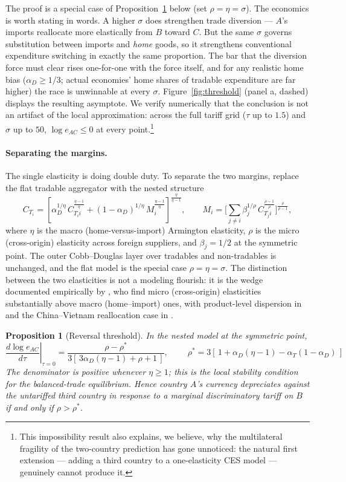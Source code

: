 \documentclass[11pt]{article}
\theoremstyle{plain}
\newtheorem{proposition}{Proposition}
\theoremstyle{remark}
\numberwithin{lemma}{section}
\numberwithin{proposition}{section}
\numberwithin{corollary}{section}
\newenvironment{revblock}{\par\begingroup\color{RevBlue}}{\endgroup\par}
\begin{document}
\begin{revblock}
The proof is a special case of Proposition~\ref{prop:threshold} below (set $\rho = \eta = \sigma$). The economics is worth stating in words. A higher $\sigma$ does strengthen trade diversion --- $A$'s imports reallocate more elastically from $B$ toward $C$. But the same $\sigma$ governs substitution between imports and \emph{home} goods, so it strengthens conventional expenditure switching in exactly the same proportion. The bar that the diversion force must clear rises one-for-one with the force itself, and for any realistic home bias ($\alpha_D \ge 1/3$; actual economies' home shares of tradable expenditure are far higher) the race is unwinnable at every $\sigma$. Figure~\ref{fig:threshold} (panel a, dashed) displays the resulting asymptote. We verify numerically that the conclusion is not an artifact of the local approximation: across the full tariff grid ($\tau$ up to $1.5$) and $\sigma$ up to $50$, $\log e_{AC} \le 0$ at every point.\footnote{This impossibility result also explains, we believe, why the multilateral fragility of the two-country prediction has gone unnoticed: the natural first extension --- adding a third country to a one-elasticity CES model --- genuinely cannot produce it.}

\paragraph{Separating the margins.} The single elasticity is doing double duty. To separate the two margins, replace the flat tradable aggregator with the nested structure
\[
C_{T_i} = \left[ \alpha_D^{1/\eta}\, C_{T_i i}^{\frac{\eta-1}{\eta}} + (1-\alpha_D)^{1/\eta}\, M_i^{\frac{\eta-1}{\eta}} \right]^{\frac{\eta}{\eta-1}},
\qquad
M_i = \Bigg[ \sum_{j \neq i} \beta_j^{1/\rho}\, C_{T_j i}^{\frac{\rho-1}{\rho}} \Bigg]^{\frac{\rho}{\rho-1}},
\]
where $\eta$ is the macro (home-versus-import) Armington elasticity, $\rho$ is the micro (cross-origin) elasticity across foreign suppliers, and $\beta_j = 1/2$ at the symmetric point. The outer Cobb--Douglas layer over tradables and non-tradables is unchanged, and the flat model is the special case $\rho = \eta = \sigma$. The distinction between the two elasticities is not a modeling flourish: it is the wedge documented empirically by \cite{feenstra2018}, who find micro (cross-origin) elasticities substantially above macro (home--import) ones, with product-level dispersion in \cite{broda2006} and the China--Vietnam reallocation case in \cite{fajgelbaum2024trade}.

\begin{proposition}[Reversal threshold]
\label{prop:threshold}
In the nested model at the symmetric point,
\[
\left.\frac{d \log e_{AC}}{d\tau}\right|_{\tau=0}
= \frac{\rho - \rho^*}{3\left[\,3\alpha_D(\eta-1) + \rho + 1\,\right]},
\qquad
\boxed{\;\rho^* = 3\left[\,1 + \alpha_D(\eta - 1) - \alpha_T(1-\alpha_D)\,\right]\;}
\]
The denominator is positive whenever $\eta \ge 1$; this is the local stability condition for the balanced-trade equilibrium. Hence country $A$'s currency depreciates against the untariffed third country in response to a marginal discriminatory tariff on $B$ if and only if $\rho > \rho^*$.
\end{proposition}


\end{revblock}
\end{document}

